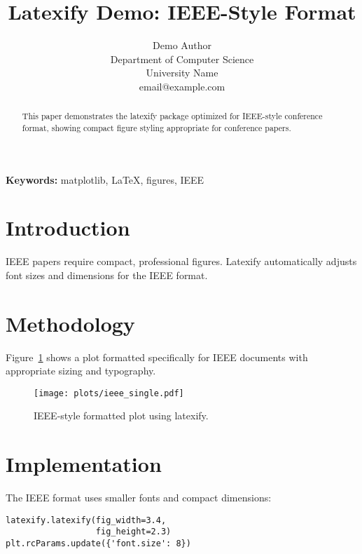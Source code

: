 \documentclass[10pt,twocolumn]{article}
\begin{document}
\title{\textbf{Latexify Demo: IEEE-Style Format}}

\author{Demo Author \\
Department of Computer Science \\
University Name \\
email@example.com}

\maketitle

\begin{abstract}
This paper demonstrates the latexify package optimized for IEEE-style conference format, showing compact figure styling appropriate for conference papers.
\end{abstract}

\textbf{Keywords:} matplotlib, LaTeX, figures, IEEE

\section{Introduction}

IEEE papers require compact, professional figures. Latexify automatically adjusts font sizes and dimensions for the IEEE format.

\section{Methodology}

Figure~\ref{fig:ieee_plot} shows a plot formatted specifically for IEEE documents with appropriate sizing and typography.

\begin{figure}[htbp]
\centering
\texttt{[image: plots/ieee\_single.pdf]}
\caption{IEEE-style formatted plot using latexify.}
\label{fig:ieee_plot}
\end{figure}

\section{Implementation}

The IEEE format uses smaller fonts and compact dimensions:

\begin{verbatim}
latexify.latexify(fig_width=3.4, 
                  fig_height=2.3)
plt.rcParams.update({'font.size': 8})
\end{verbatim}
\end{document}
